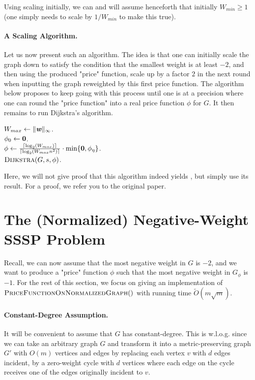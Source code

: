Using scaling initially, we can and will assume henceforth that initially $W_{min} \geq 1$ (one simply needs to scale by $1/W_{min}$ to make this true).

\paragraph{A Scaling Algorithm.} Let us now present such an algorithm. The idea is that one can initially scale the graph down to satisfy the condition that the smallest weight is at least $-2$, and then using the produced "price" function, scale up by a factor $2$ in the next round when inputting the graph reweighted by this first price function. The algorithm below proposes to keep going with this process until one is at a precision where one can round the "price function" into a real price function $\phi$ for $G$. It then remains to run Dijkstra's algorithm.

\begin{algorithm}
$W_{max} \gets \|\boldsymbol{\mathit{w}}\|_{\infty}$.\\
$\phi_0 \gets \boldsymbol{0}$.\\
$\phi \gets \frac{\lceil \log_2(W_{max})\rceil}{\lceil \log_2(W_{max} n^2)\rceil} \cdot \min\{ \boldsymbol{0}, \phi_\eta \}$.\\
\Return $\textsc{Dijkstra}(G, s, \phi)$.
\caption{$\textsc{NegativeSSSP}(G,s)$}
\end{algorithm}

Here, we will not give proof that this algorithm indeed yields , but simply use its result. For a proof, we refer you to the original paper.

\section{The (Normalized) Negative-Weight SSSP Problem}

Recall, we can now assume that the most negative weight in $G$ is $-2$, and we want to produce a "price" function $\phi$ such that the most negative weight in $G_{\phi}$ is $-1$. For the rest of this section, we focus on giving an implementation of $\textsc{PriceFunctionOnNormalizedGraph}()$ with running time $\tilde{O}(m\sqrt{m})$.

\paragraph{Constant-Degree Assumption.} It will be convenient to assume that $G$ has constant-degree. This is w.l.o.g. since we can take an arbitrary graph $G$ and transform it into a metric-preserving graph $G'$ with $O(m)$ vertices and edges by replacing each vertex $v$ with $d$ edges incident, by a zero-weight cycle with $d$ vertices where each edge on the cycle receives one of the edges originally incident to $v$.

